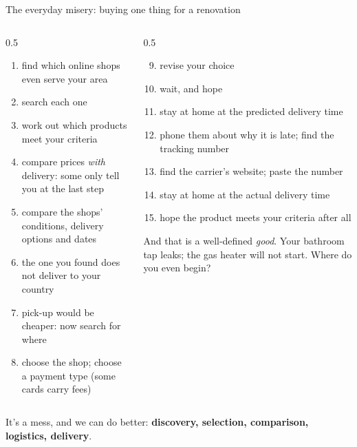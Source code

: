 \documentclass[aspectratio=169,11pt]{beamer}
\begin{document}
\begin{frame}{The everyday misery: buying one thing for a renovation}
  \footnotesize\setlength{\itemsep}{0pt}
  \begin{columns}[T]
    \begin{column}{0.5\textwidth}
      \begin{enumerate}
        \item find which online shops even serve your area
        \item search each one
        \item work out which products meet your criteria
        \item compare prices \emph{with} delivery: some only tell you at the last step
        \item compare the shops' conditions, delivery options and dates
        \item the one you found does not deliver to your country
        \item pick-up would be cheaper: now search for where
        \item choose the shop; choose a payment type (some cards carry fees)
      \end{enumerate}
    \end{column}
    \begin{column}{0.5\textwidth}
      \begin{enumerate}
        \setcounter{enumi}{8}
        \item revise your choice
        \item wait, and hope
        \item stay at home at the predicted delivery time
        \item phone them about why it is late; find the tracking number
        \item find the carrier's website; paste the number
        \item stay at home at the actual delivery time
        \item hope the product meets your criteria after all
      \end{enumerate}
      \vspace{1mm}
      \textcolor{soft}{And that is a well-defined \emph{good}. Your bathroom tap leaks; the gas heater will not start. Where do you even begin?}
    \end{column}
  \end{columns}
  \vspace{2mm}
  \centering\small It's a mess, and we can do better: \textbf{discovery, selection, comparison, logistics, delivery}.
\end{frame}
\end{document}
